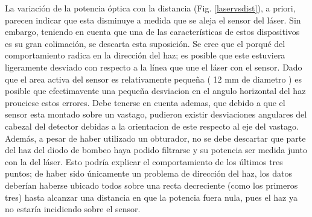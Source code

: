 \documentclass[10pt, a4paper]{article}%
\begin{document}
\begin{multicols}{2}
La variación de la potencia óptica con la distancia (Fig. \ref{laservsdist}), a priori, parecen indicar que esta disminuye a medida que se aleja el sensor del láser. Sin embargo, teniendo en cuenta que una de las características de estos dispositivos es su gran colimación, se descarta esta suposición. Se cree que el porqué del comportamiento radica en la dirección del haz; es posible que este estuviera ligeramente desviado con respecto a la línea que une el láser con el sensor. Dado que el area activa del sensor es relativamente pequeña ( 12 mm de diametro ) es posible que efectimavente una pequeña desviacion en el angulo horizontal del haz prouciese estos errores. Debe tenerse en cuenta ademas, que debido a que el sensor esta montado sobre un vastago, pudieron existir desviaciones angulares del cabezal del detector debidas a la orientacion de este respecto al eje del vastago. Además, a pesar de haber utilizado un obturador, no se debe descartar que parte del haz del diodo de bombeo haya podido filtrarse y su potencia ser medida junto con la del láser. Esto podría explicar el comportamiento de los últimos tres puntos; de haber sido únicamente un problema de dirección del haz, los datos deberían haberse ubicado todos sobre una recta decreciente (como los primeros tres) hasta alcanzar una distancia en que la potencia fuera nula, pues el haz ya no estaría incidiendo sobre el sensor. 


\end{multicols}
\end{document}
